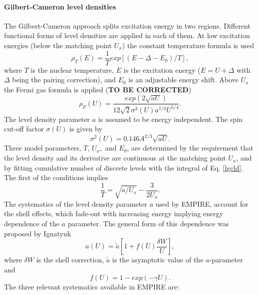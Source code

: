 \documentclass[twocolumn,amsmath,amssymb,10pt,groupedaddress,a4paper]{revtex4}
\begin{document}
\paragraph{Gilbert-Cameron level densities}
The Gilbert-Cameron approach \cite{gc} splits excitation energy in
two regions. Different functional forms of level densities
are applied in each of them. At low excitation energies (below the
matching point $U_{x}$) the constant temperature formula is used
\begin{equation}
\rho_{T}(E)=\frac{1}{T}exp\left[(E-\Delta-E_{0})/T\right],
\label{lgcld}
\end{equation}
\noindent where $T$ is the nuclear temperature, $E$ is the excitation energy
($E=U+\Delta$ with $\Delta$ being the pairing correction), and $E_{0}$
is an adjustable energy shift. Above $U_{x}$ the Fermi gas formula
is applied (\textbf{TO BE CORRECTED})
\begin{equation}
\rho_{F}(U)=\frac{exp(2\sqrt{aU})}{12\sqrt{2}\sigma^3(U)a^{1/4}U^{5/4}}.
\label{ferld}
\end{equation}
The level density parameter $a$ is assumed to be energy independent.
The spin cut-off factor $\sigma(U)$ is given by
\begin{equation}
\sigma^{2}(U)=0.146A^{2/3}\sqrt{aU}.
\label{sigld}
\end{equation}
Three model parameters, $T,\, U_{x},$ and $E_{0}$, are determined
by the requirement that the level density and its derivative are continuous
at the matching point $U_{x}$, and by fitting cumulative number of
discrete levels with the integral of Eq. \ref{lgcld}. The first of
the conditions implies
\begin{equation}
\frac{1}{T}=\sqrt{a/U_{x}}-\frac{3}{2U_{x}}.
\label{condUT}
\end{equation}
The systematics of the level density parameter $a$ used by EMPIRE,
account for the shell effects, which fade-out
with increasing energy implying energy dependence of the $a$ parameter.
The general form of this dependence was proposed by Ignatyuk~\cite{ignaa}
\begin{equation}
a(U)=\widetilde{a}[1+f(U)\frac{\delta W}{U}],
\label{apiccoloGC}
\end{equation}
\noindent where $\delta W$ is the shell correction, $\widetilde{a}$ is the
asymptotic value of the $a$-parameter and
\begin{equation}
f(U)=1-exp(-\gamma U).
\label{shellGC}
\end{equation}
The three relevant systematics available in EMPIRE are:
\end{document}
